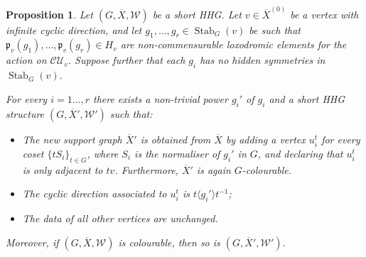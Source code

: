\documentclass[svgnames]{amsart}
\theoremstyle{plain}
\newtheorem{prop}[thm]{Proposition}
\theoremstyle{definition}
\newcommand{\C}{\mathcal C}
\newcommand{\ov}[1]{\overline{#1}}
\newcommand{\U}{\mathcal{U}}
\newcommand{\Stab}[2]{\operatorname{Stab}_{#1}(#2)}
\newcommand{\W}{\mathcal{W}}
\newcommand{\p}{\mathfrak{p}}
\begin{document}
\begin{prop}\label{prop:add_partial_loxo}
Let $(G, \ov{X},\W)$ be a short HHG. Let $v\in\ov{X}^{(0)}$ be a vertex with infinite cyclic direction, and let $g_1,\ldots,g_r\in \Stab{G}{v}$ be such that $\p_v(g_1), \ldots, \p_v(g_r)\in H_v$ are non-commensurable loxodromic elements for the action on $\C\U_{v}$. Suppose further that each $g_i$ has no hidden symmetries in $\Stab{G}{v}$.

For every $i=1\ldots, r$ there exists a non-trivial power $g_i'$ of $g_i$ and a short HHG structure $(G, \ov X',\W')$ such that:
\begin{itemize}
        \item The new support graph $\ov X'$ is obtained from $\ov{X}$ by adding a vertex $u_i^t$ for every coset $\{tS_{i}\}_{t\in G}$, where $S_i$ is the normaliser of $g_i'$ in $G$, and declaring that $u_i^t$ is only adjacent to $t v$. Furthermore, $\ov X'$ is again $G$-colourable.
        \item The cyclic direction associated to $u_i^t$ is $t\langle g_i'\rangle t^{-1}$;
        \item The data of all other vertices are unchanged.
    \end{itemize}
    Moreover, if $(G, \ov X,\W)$ is colourable, then so is $(G, \ov X',\W')$.
\end{prop}
\end{document}
